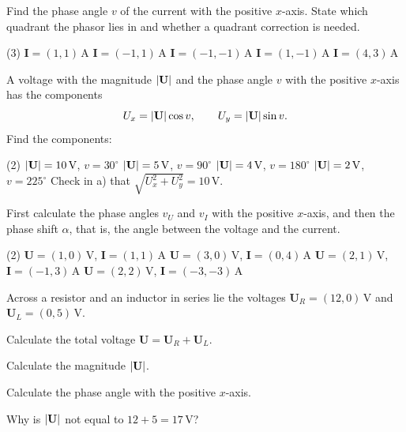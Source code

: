 Find the phase angle $v$ of the current with the positive $x$-axis. State which quadrant the
phasor lies in and whether a quadrant correction is needed.
\begin{delar}(3)
  \task $\mathbf{I} = (1, 1)\,\text{A}$
  \task $\mathbf{I} = (-1, 1)\,\text{A}$
  \task $\mathbf{I} = (-1, -1)\,\text{A}$
  \task $\mathbf{I} = (1, -1)\,\text{A}$
  \task $\mathbf{I} = (4, 3)\,\text{A}$
\end{delar}

A voltage with the magnitude $\lvert\mathbf{U}\rvert$ and the phase angle $v$ with the positive $x$-axis
has the components
\[
  U_x = \lvert\mathbf{U}\rvert \cos v, \qquad U_y = \lvert\mathbf{U}\rvert \sin v.
\]
Find the components:
\begin{delar}(2)
  \task $\lvert\mathbf{U}\rvert = 10\,\text{V}$, $v = 30^{\circ}$
  \task $\lvert\mathbf{U}\rvert = 5\,\text{V}$, $v = 90^{\circ}$
  \task $\lvert\mathbf{U}\rvert = 4\,\text{V}$, $v = 180^{\circ}$
  \task $\lvert\mathbf{U}\rvert = 2\,\text{V}$, $v = 225^{\circ}$
  \task* Check in a) that $\sqrt{U_x^2 + U_y^2} = 10\,\text{V}$.
\end{delar}

First calculate the phase angles $v_U$ and $v_I$ with the positive $x$-axis, and then the phase
shift $\alpha$, that is, the angle between the voltage and the current.
\begin{delar}(2)
  \task $\mathbf{U} = (1, 0)\,\text{V}$, $\mathbf{I} = (1, 1)\,\text{A}$
  \task $\mathbf{U} = (3, 0)\,\text{V}$, $\mathbf{I} = (0, 4)\,\text{A}$
  \task $\mathbf{U} = (2, 1)\,\text{V}$, $\mathbf{I} = (-1, 3)\,\text{A}$
  \task $\mathbf{U} = (2, 2)\,\text{V}$, $\mathbf{I} = (-3, -3)\,\text{A}$
\end{delar}

Across a resistor and an inductor in series lie the voltages $\mathbf{U}_R = (12, 0)\,\text{V}$
and $\mathbf{U}_L = (0, 5)\,\text{V}$.
\begin{parts}
  \item Calculate the total voltage $\mathbf{U} = \mathbf{U}_R + \mathbf{U}_L$.
  \item Calculate the magnitude $\lvert\mathbf{U}\rvert$.
  \item Calculate the phase angle with the positive $x$-axis.
  \item Why is $\lvert\mathbf{U}\rvert$ not equal to $12 + 5 = 17\,\text{V}$?
\end{parts}

